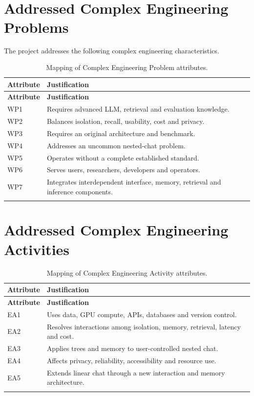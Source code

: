 \section{Addressed Complex Engineering Problems}
The project addresses the following complex engineering characteristics.

\begin{longtable}{p{}p{}}
\caption{Mapping of Complex Engineering Problem attributes.}\label{tab:annexA_wp}\\
\toprule
\textbf{Attribute} & \textbf{Justification} \\
\midrule
\endfirsthead
\toprule
\textbf{Attribute} & \textbf{Justification} \\
\midrule
\endhead
WP1 & Requires advanced LLM, retrieval and evaluation knowledge. \\
WP2 & Balances isolation, recall, usability, cost and privacy. \\
WP3 & Requires an original architecture and benchmark. \\
WP4 & Addresses an uncommon nested-chat problem. \\
WP5 & Operates without a complete established standard. \\
WP6 & Serves users, researchers, developers and operators. \\
WP7 & Integrates interdependent interface, memory, retrieval and inference components. \\
\botrule
\end{longtable}

\section{Addressed Complex Engineering Activities}
\begin{longtable}{p{}p{}}
\caption{Mapping of Complex Engineering Activity attributes.}\label{tab:annexA_ea}\\
\toprule
\textbf{Attribute} & \textbf{Justification} \\
\midrule
\endfirsthead
\toprule
\textbf{Attribute} & \textbf{Justification} \\
\midrule
\endhead
EA1 & Uses data, GPU compute, APIs, databases and version control. \\
EA2 & Resolves interactions among isolation, memory, retrieval, latency and cost. \\
EA3 & Applies trees and memory to user-controlled nested chat. \\
EA4 & Affects privacy, reliability, accessibility and resource use. \\
EA5 & Extends linear chat through a new interaction and memory architecture. \\
\botrule
\end{longtable}
